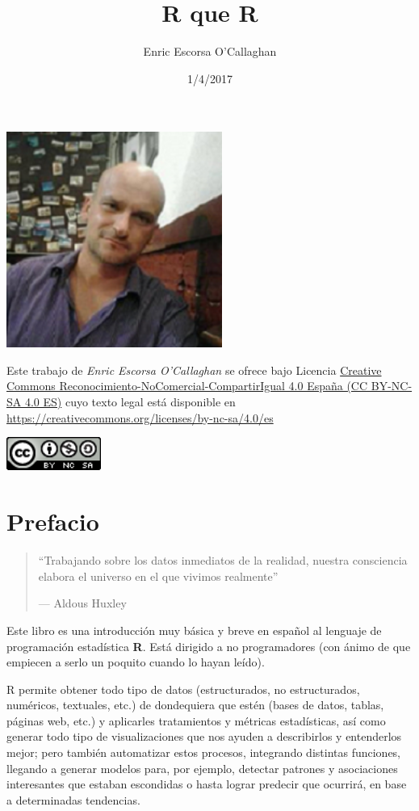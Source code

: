 \documentclass[]{book}
\title{R que R}
\author{Enric Escorsa O'Callaghan}
\date{1/4/2017}
\theoremstyle{definition}
\theoremstyle{definition}
\theoremstyle{remark}
\begin{document}
\maketitle

{
\setcounter{tocdepth}{1}
\tableofcontents
}
\includegraphics[width=2.78in]{fotoenric2}

Este trabajo de \emph{Enric Escorsa O'Callaghan} se ofrece bajo Licencia
\href{https://creativecommons.org/licenses/by-nc-sa/4.0/es/}{Creative
Commons Reconocimiento-NoComercial-CompartirIgual 4.0 España (CC
BY-NC-SA 4.0 ES)} cuyo texto legal está disponible en
\url{https://creativecommons.org/licenses/by-nc-sa/4.0/es}

\includegraphics[width=1.22in]{cc}

\chapter{Prefacio}\label{prefacio}

\begin{quote}
``Trabajando sobre los datos inmediatos de la realidad, nuestra
consciencia elabora el universo en el que vivimos realmente''

--- Aldous Huxley
\end{quote}

Este libro es una introducción muy básica y breve en español al lenguaje
de programación estadística \textbf{R}. Está dirigido a no programadores
(con ánimo de que empiecen a serlo un poquito cuando lo hayan leído).

R permite obtener todo tipo de datos (estructurados, no estructurados,
numéricos, textuales, etc.) de dondequiera que estén (bases de datos,
tablas, páginas web, etc.) y aplicarles tratamientos y métricas
estadísticas, así como generar todo tipo de visualizaciones que nos
ayuden a describirlos y entenderlos mejor; pero también automatizar
estos procesos, integrando distintas funciones, llegando a generar
modelos para, por ejemplo, detectar patrones y asociaciones interesantes
que estaban escondidas o hasta lograr predecir que ocurrirá, en base a
determinadas tendencias.
\end{document}
